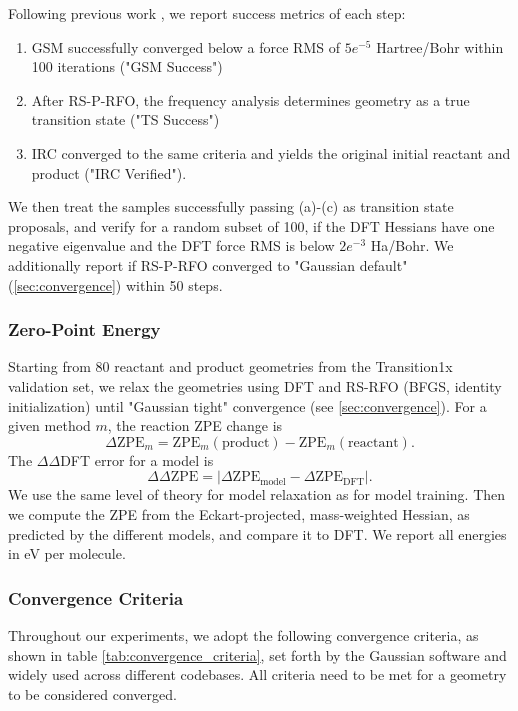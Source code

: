 \documentclass[pdflatex,sn-mathphys-num]{sn-jnl}%
\theoremstyle{thmstyleone}%
\theoremstyle{thmstyletwo}%
\theoremstyle{thmstylethree}%
\begin{document}
\begin{appendices}
Following previous work \citep{zhao2025, cui2025horm}, we report success metrics of each step: 
\begin{enumerate}
    \item 
GSM successfully converged below a force RMS of $5e^{-5}$ Hartree/Bohr within 100 iterations ("GSM Success")
\item After RS-P-RFO, the frequency analysis determines geometry as a true transition state ("TS Success")
\item IRC converged to the same criteria and yields the original initial reactant and product ("IRC Verified").
\end{enumerate}
We then treat the samples successfully passing (a)-(c) as transition state proposals, and verify for a random subset of 100, if the DFT Hessians have one negative eigenvalue and the DFT force RMS is below $2e^{-3}$ Ha/Bohr. We additionally report if RS-P-RFO converged to "Gaussian default" (\ref{sec:convergence}) within 50 steps.

\subsubsection{Zero-Point Energy\label{sec:zpe_setup}}
Starting from 80 reactant and product geometries from the Transition1x validation set, we relax the geometries using DFT and RS-RFO (BFGS, identity initialization) until "Gaussian tight" convergence (see \ref{sec:convergence}).
For a given method $m$, the reaction ZPE change is
$$
\Delta \mathrm{ZPE}_{m}
= \mathrm{ZPE}_{m}(\text{product}) - \mathrm{ZPE}_{m}(\text{reactant}).
$$
The $\Delta\Delta$DFT error for a model is
$$
\Delta\Delta \mathrm{ZPE}
= \bigl|\Delta \mathrm{ZPE}_{\text{model}} - \Delta \mathrm{ZPE}_{\text{DFT}}\bigr|.
$$
We use the same level of theory for model relaxation as for model training.
Then we compute the ZPE from the Eckart-projected, mass-weighted Hessian, as predicted by the different models, and compare it to DFT.
We report all energies in eV per molecule. 

\subsubsection{Convergence Criteria\label{sec:convergence}}
Throughout our experiments, we adopt the following convergence criteria, as shown in table \ref{tab:convergence_criteria}, set forth by the Gaussian software and widely used across different codebases.
All criteria need to be met for a geometry to be considered converged.


\end{appendices}
\end{document}
